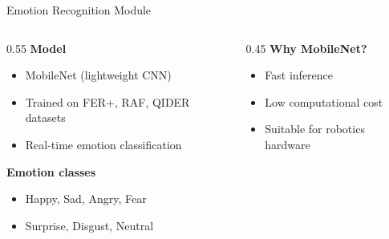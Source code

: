 \documentclass[aspectratio=169,10pt]{beamer}
\begin{document}
\begin{frame}{Emotion Recognition Module}
\footnotesize

\begin{columns}[T]

\begin{column}{0.55\textwidth}
\textbf{Model}
\begin{itemize}\footnotesize
    \item MobileNet (lightweight CNN)
    \item Trained on FER+, RAF, QIDER datasets
    \item Real-time emotion classification
\end{itemize}

\textbf{Emotion classes}
\begin{itemize}\footnotesize
    \item Happy, Sad, Angry, Fear
    \item Surprise, Disgust, Neutral
\end{itemize}
\end{column}

\begin{column}{0.45\textwidth}
\textbf{Why MobileNet?}
\begin{itemize}\footnotesize
    \item Fast inference
    \item Low computational cost
    \item Suitable for robotics hardware
\end{itemize}
\end{column}

\end{columns}

\end{frame}

\end{document}
